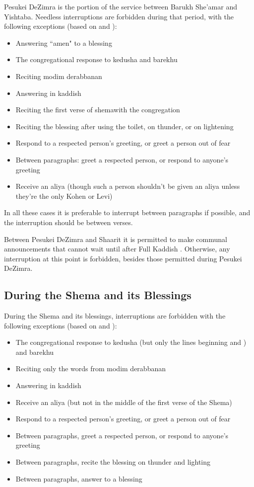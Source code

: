 Pesukei DeZimra is the portion of the service between Barukh She'amar and Yishtaba\heth . Needless interruptions are forbidden during that period, with the following exceptions (based on \cite*[``Table of Permitted Responses"]{Koren} and \cite*[16:5]{PH}):
\begin{itemize}
	\item Answering ``amen" to a blessing 
	\item The congregational response to kedusha and barekhu
	\item Reciting modim derabbanan
	\item Answering  in kaddish
	\item Reciting the first verse of shema\space with the congregation
	\item Reciting the blessing after using the toilet, on thunder, or on lightening
	\item Respond to a respected person's greeting, or greet a person out of fear
	\item Between paragraphs: greet a respected person, or respond to anyone's greeting
	\item Receive an aliya (though such a person shouldn't be given an aliya unless they're the only Kohen or Levi)
\end{itemize}

In all these cases it is preferable to interrupt between paragraphs if possible, and the interruption should be between verses.

Between Pesukei DeZimra and Sha\heth arit it is permitted to make communal announcements that cannot wait until after Full Kaddish \parencite*[16:2]{PH}.  Otherwise, any interruption at this point is forbidden, besides those permitted during Pesukei DeZimra.

\subsection{During the Shema and its Blessings}

During the Shema and its blessings, interruptions are forbidden with the following exceptions (based on \cite*[``Table of Permitted Responses"]{Koren} and \cite*[16:5]{PH}):
\begin{itemize}
	\item The congregational response to kedusha (but only the lines beginning  and ) and barekhu
	\item Reciting only the words  from modim derabbanan
	\item Answering  in kaddish
	\item Receive an aliya (but not in the middle of the first verse of the Shema)
	\item Respond to a respected person's greeting, or greet a person out of fear
	\item Between paragraphs, greet a respected person, or respond to anyone's greeting
	\item Between paragraphs, recite the blessing on thunder and lighting
	\item Between paragraphs, answer  to a blessing
\end{itemize}

